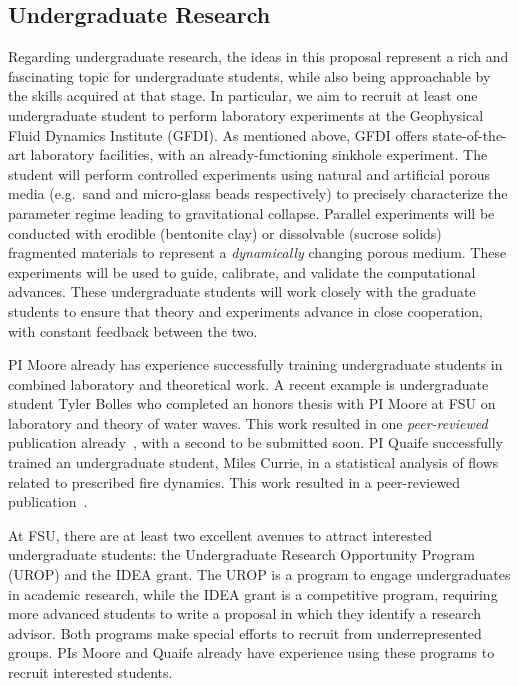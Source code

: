 \documentclass[11pt]{article}
\begin{document}
\subsection{Undergraduate Research}
Regarding undergraduate research, the ideas in this proposal represent a rich and fascinating topic for undergraduate students, while also being approachable by the skills acquired at that stage. In particular, we aim to recruit at least one undergraduate student to perform laboratory experiments at the Geophysical Fluid Dynamics Institute (GFDI). As mentioned above, GFDI offers state-of-the-art laboratory facilities, with an already-functioning sinkhole experiment. The student will perform controlled experiments using natural and artificial porous media (e.g.~sand and micro-glass beads respectively) to precisely characterize the parameter regime leading to gravitational collapse. Parallel experiments will be conducted with erodible (bentonite clay) or dissolvable  (sucrose solids) fragmented materials to represent a {\em dynamically} changing porous medium. These experiments will be used to guide, calibrate, and validate the computational advances. These undergraduate students will work closely with the graduate students to ensure that theory and experiments advance in close cooperation, with constant feedback between the two.

PI Moore already has experience successfully training undergraduate students in combined laboratory and theoretical work. A recent example is undergraduate student Tyler Bolles who completed an honors thesis with PI Moore at FSU on laboratory and theory of water waves. This work resulted in one {\em peer-reviewed} publication already~\cite{Bolles2019}, with a second to be submitted soon. PI Quaife successfully trained an undergraduate student, Miles Currie, in a statistical analysis of flows related to prescribed fire dynamics.  This work resulted in a peer-reviewed publication~\cite{cur-spe-hie-obr-goo-qua2018}.

At FSU, there are at least two excellent avenues to attract interested undergraduate students:  the Undergraduate Research Opportunity Program (UROP) and the IDEA grant. The UROP is a program to engage undergraduates in academic research, while the IDEA grant is a competitive program, requiring more advanced students to write a proposal in which they identify a research advisor. Both programs make special efforts to recruit from underrepresented groups. PIs Moore and Quaife already have experience using these programs to recruit interested students.
\end{document}
